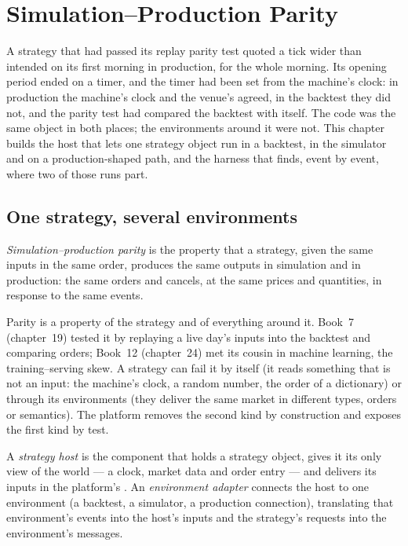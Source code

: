 \chapter{Simulation--Production Parity}\label{ch:pl:simulation-production-parity}

A strategy that had passed its replay parity test quoted a tick wider than intended on its first morning in production, for the whole
morning. Its opening period ended on a timer, and the timer had been set from the machine's clock: in production the machine's clock
and the venue's agreed, in the backtest they did not, and the parity test had compared the backtest with itself. The code was the same
object in both places; the environments around it were not. This chapter builds the host that lets one strategy object run in a
backtest, in the simulator and on a production-shaped path, and the harness that finds, event by event, where two of those runs part.

\section{One strategy, several environments}

\begin{definition}\label{def:pl:simulation-production-parity:parity}
\emph{Simulation--production parity} is the property that a strategy, given the same inputs in
the same order, produces the same outputs in simulation and in production: the same orders and cancels, at the same prices and
quantities, in response to the same events.
\end{definition}

Parity is a property of the strategy and of everything around it. Book~7 (chapter~19) tested it by replaying a live day's inputs into
the backtest and comparing orders; Book~12 (chapter~24) met its cousin in machine learning, the training--serving skew. A strategy can
fail it by itself (it reads something that is not an input: the machine's clock, a random number, the order of a dictionary) or through
its environments (they deliver the same market in different types, orders or semantics). The platform removes the second kind by
construction and exposes the first kind by test.

\begin{definition}\label{def:pl:simulation-production-parity:host}
A \emph{strategy host} is the component that holds a strategy object, gives it its only view of the world --- a
clock, market data and order entry --- and delivers its inputs in the platform's . An \emph{environment
adapter} connects the host to one environment (a backtest, a simulator, a production connection), translating
that environment's events into the host's inputs and the strategy's requests into the environment's messages.
\end{definition}

